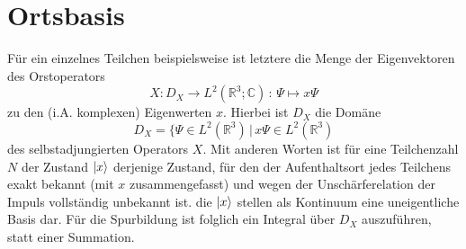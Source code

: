 % 
% 
% 
% 

\chapter{Ortsbasis}
\label{sec:A_1}
Für ein einzelnes Teilchen beispielsweise ist letztere die Menge der Eigenvektoren des Orstoperators
\begin{equation*}
  X:D_X \rightarrow L^2(\mathbb{R}^3;\mathbb{C}) \, : \, \Psi \mapsto x\Psi
\end{equation*}
zu den (i.A. komplexen) Eigenwerten $x$. Hierbei ist $D_X$ die Domäne
\begin{equation*}
  D_X = \{\Psi \in L^2(\mathbb{R}^3) \, | \, x\Psi \in L^2(\mathbb{R}^3)
\end{equation*}
des selbstadjungierten Operators $X$. Mit anderen Worten ist für eine Teilchenzahl $N$ der Zustand $\ket{x}$ derjenige Zustand, für den der Aufenthaltsort jedes Teilchens exakt bekannt (mit $x$ zusammengefasst) und wegen der Unschärferelation der Impuls vollständig unbekannt ist.
die $\ket{x}$ stellen als Kontinuum eine uneigentliche Basis dar. Für die Spurbildung ist folglich ein Integral über $D_X$ auszuführen, statt einer Summation.

